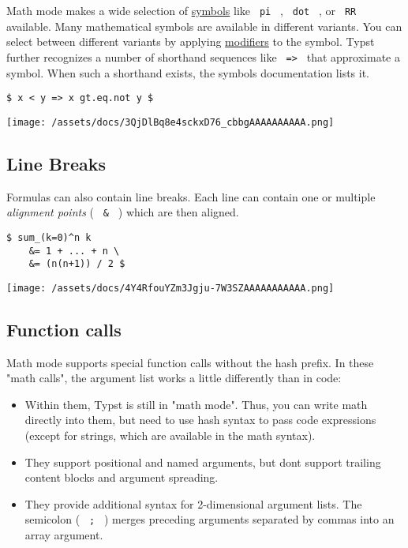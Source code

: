 Math mode makes a wide selection of
\href{/docs/reference/symbols/sym/}{symbols} like \texttt{\ pi\ } ,
\texttt{\ dot\ } , or \texttt{\ RR\ } available. Many mathematical
symbols are available in different variants. You can select between
different variants by applying
\href{/docs/reference/symbols/symbol/}{modifiers} to the symbol. Typst
further recognizes a number of shorthand sequences like
\texttt{\ =\textgreater{}\ } that approximate a symbol. When such a
shorthand exists, the symbol\textquotesingle s documentation lists it.

\begin{verbatim}
$ x < y => x gt.eq.not y $
\end{verbatim}

\texttt{[image: /assets/docs/3QjDlBq8e4sckxD76\_cbbgAAAAAAAAAA.png]}

\subsection{Line Breaks}\label{line-breaks}

Formulas can also contain line breaks. Each line can contain one or
multiple \emph{alignment points} ( \texttt{\ \&\ } ) which are then
aligned.

\begin{verbatim}
$ sum_(k=0)^n k
    &= 1 + ... + n \
    &= (n(n+1)) / 2 $
\end{verbatim}

\texttt{[image: /assets/docs/4Y4RfouYZm3Jgju-7W3SZAAAAAAAAAAA.png]}

\subsection{Function calls}\label{function-calls}

Math mode supports special function calls without the hash prefix. In
these "math calls", the argument list works a little differently than in
code:

\begin{itemize}
\tightlist
\item
  Within them, Typst is still in "math mode". Thus, you can write math
  directly into them, but need to use hash syntax to pass code
  expressions (except for strings, which are available in the math
  syntax).
\item
  They support positional and named arguments, but don\textquotesingle t
  support trailing content blocks and argument spreading.
\item
  They provide additional syntax for 2-dimensional argument lists. The
  semicolon ( \texttt{\ ;\ } ) merges preceding arguments separated by
  commas into an array argument.
\end{itemize}

